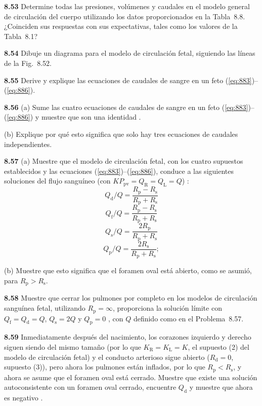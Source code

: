 \documentclass[12pt]{book}
\begin{document}
\textbf{8.53} Determine todas las presiones, volúmenes y caudales en el modelo general de circulación del cuerpo utilizando los datos proporcionados en la Tabla~8.8. ¿Coinciden sus respuestas con sus expectativas, tales como los valores de la Tabla~8.1?

\textbf{8.54} Dibuje un diagrama para el modelo de circulación fetal, siguiendo las líneas de la Fig.~8.52.

\textbf{8.55} Derive y explique las ecuaciones de caudales de sangre en un feto (\ref{eq:883})--(\ref{eq:886}).

\textbf{8.56} (a) Sume las cuatro ecuaciones de caudales de sangre en un feto (\ref{eq:883})--(\ref{eq:886}) y muestre que son una identidad \cite{34}.

(b) Explique por qué esto significa que solo hay tres ecuaciones de caudales independientes.

\textbf{8.57} (a) Muestre que el modelo de circulación fetal, con los cuatro supuestos establecidos y las ecuaciones (\ref{eq:883})--(\ref{eq:886}), conduce a las siguientes soluciones del flujo sanguíneo (con $K P_{\text{pv}} = Q_{\text{R}} = Q_{\text{L}} = Q$) \cite{34}:
\begin{equation}
Q_{\text{d}}/Q = \frac{R_{\text{p}} - R_{\text{s}}}{R_{\text{p}} + R_{\text{s}}}
\label{eq:8128}
\end{equation}
\begin{equation}
Q_{\text{f}}/Q = \frac{R_{\text{p}} - R_{\text{s}}}{R_{\text{p}} + R_{\text{s}}}
\label{eq:8129}
\end{equation}
\begin{equation}
Q_{\text{s}}/Q = \frac{2 R_{\text{p}}}{R_{\text{p}} + R_{\text{s}}}
\label{eq:8130}
\end{equation}
\begin{equation}
Q_{\text{p}}/Q = \frac{2 R_{\text{s}}}{R_{\text{p}} + R_{\text{s}}};
\label{eq:8131}
\end{equation}

(b) Muestre que esto significa que el foramen oval está abierto, como se asumió, para $R_{\text{p}} > R_{\text{s}}$.

\textbf{8.58} Muestre que cerrar los pulmones por completo en los modelos de circulación sanguínea fetal, utilizando $R_{\text{p}} = \infty$, proporciona la solución límite con $Q_{\text{f}} = Q_{\text{d}} = Q$, $Q_{\text{s}} = 2Q$ y $Q_{\text{p}} = 0$ \cite{34}, con $Q$ definido como en el Problema~8.57.

\textbf{8.59} Inmediatamente después del nacimiento, los corazones izquierdo y derecho siguen siendo del mismo tamaño (por lo que $K_{\text{R}} = K_{\text{L}} = K$, el supuesto (2) del modelo de circulación fetal) y el conducto arterioso sigue abierto ($R_{\text{d}} = 0$, supuesto (3)), pero ahora los pulmones están inflados, por lo que $R_{\text{p}} < R_{\text{s}}$, y ahora se asume que el foramen oval está cerrado. Muestre que existe una solución autoconsistente con un foramen oval cerrado, encuentre $Q_{\text{d}}$ y muestre que ahora es negativo \cite{34}.
\end{document}
